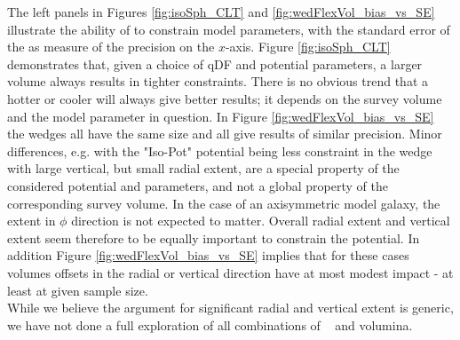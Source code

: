 The left panels in Figures \ref{fig:isoSph_CLT} and \ref{fig:wedFlexVol_bias_vs_SE} illustrate the ability of \RM to constrain model parameters, with the standard error of the \pdf as measure of the precision on the $x$-axis. Figure \ref{fig:isoSph_CLT} demonstrates that, given a choice of qDF and potential parameters, a larger volume always results in tighter constraints. There is no obvious trend that a hotter or cooler \MAP will always give better results; it depends on the survey volume and the model parameter in question. In Figure \ref{fig:wedFlexVol_bias_vs_SE} the wedges all have the same size and all give results of similar precision. Minor differences, e.g. with the "Iso-Pot" potential being less constraint in the wedge with large vertical, but small radial extent, are a special property of the considered potential and parameters, and not a global property of the corresponding survey volume. In the case of an axisymmetric model galaxy, the extent in $\phi$ direction is not expected to matter. Overall radial extent and vertical extent seem therefore to be equally important to constrain the potential. In addition Figure \ref{fig:wedFlexVol_bias_vs_SE} implies that for these cases volumes offsets in the radial or vertical direction have at most modest impact - at least at given sample size.
\\While we believe the argument for significant radial and vertical extent is generic, we have not done a full exploration of all combinations of \pmodel~ and volumina.




